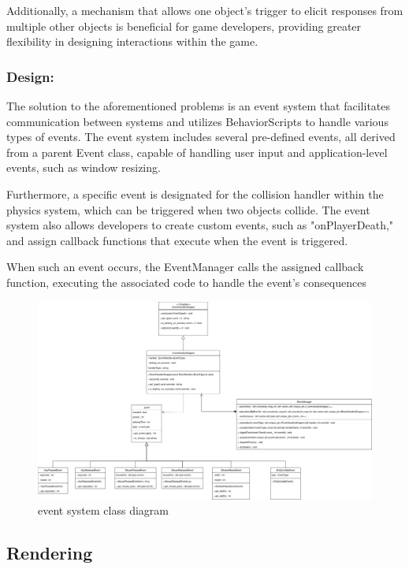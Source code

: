 \documentclass{projdoc}
\begin{document}
Additionally, a mechanism that allows one object's trigger to elicit responses from multiple other objects is beneficial for game developers, providing greater flexibility in designing interactions within the game.

\subsubsection{Design:}
The solution to the aforementioned problems is an event system that facilitates communication between systems and utilizes BehaviorScripts to handle various types of events. The event system includes several pre-defined events, all derived from a parent Event class, capable of handling user input and application-level events, such as window resizing.

Furthermore, a specific event is designated for the collision handler within the physics system, which can be triggered when two objects collide. The event system also allows developers to create custom events, such as "onPlayerDeath," and assign callback functions that execute when the event is triggered.

When such an event occurs, the EventManager calls the assigned callback function, executing the associated code to handle the event's consequences
\begin{figure}
    \centering
    \includegraphics[width=\linewidth]{img/event-uml.drawio.png}  %
    \caption{event system class diagram}
    \label{fig:event-uml}
\end{figure}
\subsection{Rendering}

\end{document}
